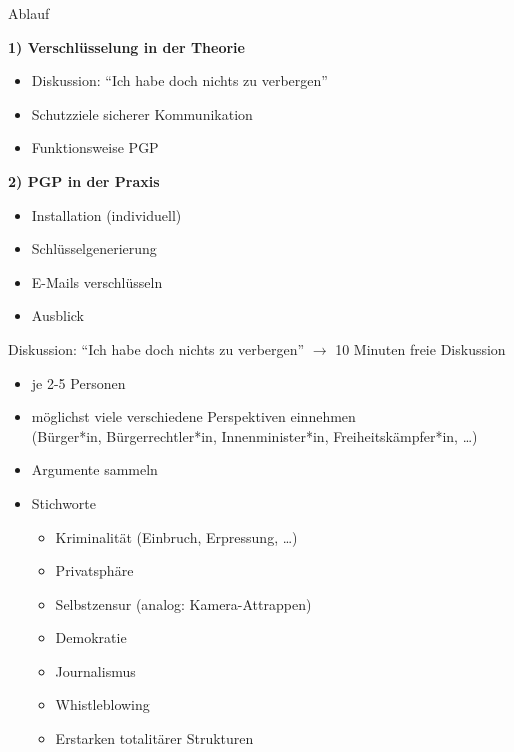 \documentclass{beamer}
\begin{document}

\begin{frame}{Ablauf}

  \textbf{1) Verschlüsselung in der Theorie}
  \begin{itemize}
   \item Diskussion: "`Ich habe doch nichts zu verbergen"'
   \item Schutzziele sicherer Kommunikation
   \item Funktionsweise PGP
  \end{itemize}

  \pause

  \textbf{2) PGP in der Praxis}
  \begin{itemize}
   \item Installation (individuell)
   \item Schlüsselgenerierung
   \item E-Mails verschlüsseln
   \item Ausblick
  \end{itemize}

\end{frame}


\begin{frame}{Diskussion: "`Ich habe doch nichts zu verbergen"'}
  $\rightarrow$ 10 Minuten freie Diskussion
  
  \begin{itemize}
   \item  je 2-5 Personen
   \item möglichst viele verschiedene Perspektiven einnehmen\\
  (Bürger*in, Bürgerrechtler*in, Innenminister*in, Freiheitskämpfer*in, …)
   \item Argumente sammeln

   \pause

   \item Stichworte
    \begin{itemize}
     \item Kriminalität (Einbruch, Erpressung, …)
     \item Privatsphäre
     \item Selbstzensur (analog: Kamera-Attrappen)
     \item Demokratie
     \item Journalismus
     \item Whistleblowing
     \item Erstarken totalitärer Strukturen
    \end{itemize}
  \end{itemize}

\end{frame}
\end{document}
